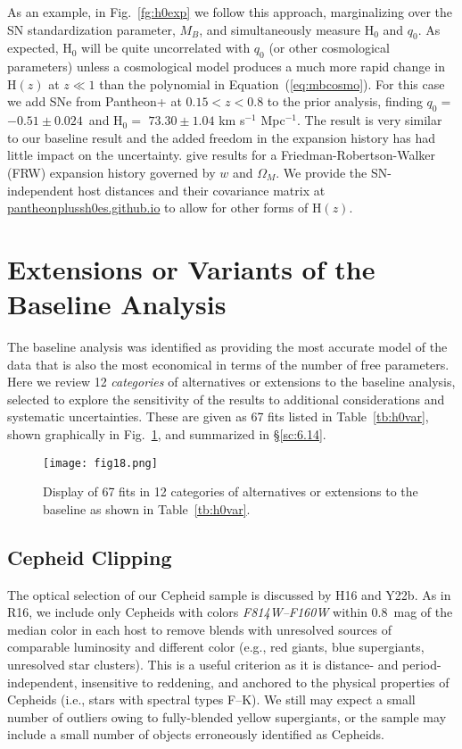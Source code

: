 \documentclass[12pt]{aastex631}
\newcommand{\hhiz}{$ 73.30 \pm 1.04 $ km s$^{-1}$ Mpc$^{-1}$}
\newcommand{\qhiz}{$ -0.51 \pm 0.024 $}
\begin{document}
As an example, in Fig.~\ref{fg:h0exp} we follow this approach, marginalizing over the SN standardization parameter, $M_B$, and simultaneously measure H$_0$ and $q_0$.  As expected, H$_0$ will be quite uncorrelated with $q_0$ (or other cosmological parameters) unless a cosmological model produces a much more rapid change in H$(z)$ at $z \ll 1$ than the polynomial in Equation~(\ref{eq:mbcosmo}). For this case we add SNe from Pantheon+ at $0.15<z<0.8$ to the prior analysis, finding $q_0 =$ \qhiz\ and H$_0 =$ \hhiz. The result is very similar to our baseline result and the added freedom in the expansion history has had little impact on the uncertainty. \citet{Brout:2022} give results for a Friedman-Robertson-Walker (FRW) expansion history governed by $w$ and $\Omega_M$.  We provide the SN-independent host distances and their covariance matrix at \url{pantheonplussh0es.github.io} to allow for other forms of H$(z)$.  

\section{Extensions or Variants of the Baseline Analysis\label{sc:6}}

The baseline analysis was identified as providing the most accurate model of the data that is also the most economical in terms of the number of free parameters. Here we review 12 {\it categories} of alternatives or extensions to the baseline analysis, selected to explore the sensitivity of the results to additional considerations and systematic uncertainties. These are given as 67 fits listed in Table~\ref{tb:h0var}, shown graphically in Fig.~\ref{fg:vars}, and summarized in \S\ref{sc:6.14}.
 
\begin{figure}[b]   
\begin{center}
\texttt{[image: fig18.png]}
\end{center}
\caption{\label{fg:vars} Display of 67 fits in 12 categories of alternatives or extensions to the baseline as shown in Table~\ref{tb:h0var}. }
\end{figure}

\subsection{Cepheid Clipping\label{sc:6.1}}
  
The optical selection of our Cepheid sample is discussed by H16 and Y22b. As in R16, we include only Cepheids with colors {\it F814W--F160W} within 0.8~mag of the median color in each host to remove blends with unresolved sources of comparable luminosity and different color (e.g., red giants, blue supergiants, unresolved star clusters). This is a useful criterion as it is distance- and period-independent, insensitive to reddening, and anchored to the physical properties of Cepheids (i.e., stars with spectral types F--K). We still may expect a small number of outliers owing to fully-blended yellow supergiants, or the sample may include a small number of objects erroneously identified as Cepheids.
  
\end{document}
